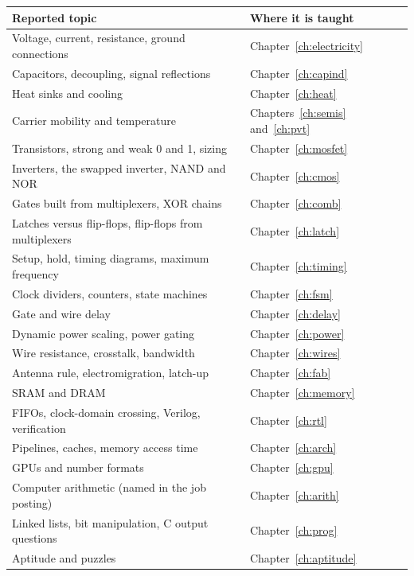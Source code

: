 \begin{center}
\begin{tabularx}{\linewidth}{>{\raggedright\arraybackslash}X l}
\toprule
\textbf{Reported topic} & \textbf{Where it is taught} \\
\midrule
Voltage, current, resistance, ground connections & Chapter~\ref{ch:electricity} \\
Capacitors, decoupling, signal reflections & Chapter~\ref{ch:capind} \\
Heat sinks and cooling & Chapter~\ref{ch:heat} \\
Carrier mobility and temperature & Chapters~\ref{ch:semis} and~\ref{ch:pvt} \\
Transistors, strong and weak 0 and 1, sizing & Chapter~\ref{ch:mosfet} \\
Inverters, the swapped inverter, NAND and NOR & Chapter~\ref{ch:cmos} \\
Gates built from multiplexers, XOR chains & Chapter~\ref{ch:comb} \\
Latches versus flip-flops, flip-flops from multiplexers & Chapter~\ref{ch:latch} \\
Setup, hold, timing diagrams, maximum frequency & Chapter~\ref{ch:timing} \\
Clock dividers, counters, state machines & Chapter~\ref{ch:fsm} \\
Gate and wire delay & Chapter~\ref{ch:delay} \\
Dynamic power scaling, power gating & Chapter~\ref{ch:power} \\
Wire resistance, crosstalk, bandwidth & Chapter~\ref{ch:wires} \\
Antenna rule, electromigration, latch-up & Chapter~\ref{ch:fab} \\
SRAM and DRAM & Chapter~\ref{ch:memory} \\
FIFOs, clock-domain crossing, Verilog, verification & Chapter~\ref{ch:rtl} \\
Pipelines, caches, memory access time & Chapter~\ref{ch:arch} \\
GPUs and number formats & Chapter~\ref{ch:gpu} \\
Computer arithmetic (named in the job posting) & Chapter~\ref{ch:arith} \\
Linked lists, bit manipulation, C output questions & Chapter~\ref{ch:prog} \\
Aptitude and puzzles & Chapter~\ref{ch:aptitude} \\
\bottomrule
\end{tabularx}
\end{center}

